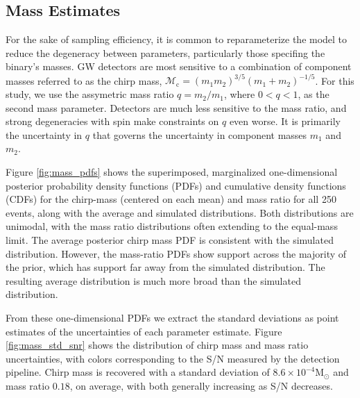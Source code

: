 \subsection{Mass Estimates}

For the sake of sampling efficiency, it is common to reparameterize the model to reduce the degeneracy between parameters, particularly those specifing the binary's masses.  GW detectors are most sensitive to a combination of component masses referred to as the chirp mass, $\mathcal{M}_\mathrm{c} = (m_1 m_2)^{3/5} (m_1 + m_2)^{-1/5}$.  For this study, we use the assymetric mass ratio $q = m_2/m_1$, where $0 < q < 1$, as the second mass parameter.  Detectors are much less sensitive to the mass ratio, and strong degeneracies with spin make constraints on $q$ even worse.  It is primarily the uncertainty in $q$ that governs the uncertainty in component masses $m_1$ and $m_2$.

Figure \ref{fig:mass_pdfs} shows the superimposed, marginalized one-dimensional posterior probability density functions (PDFs) and cumulative density functions (CDFs) for the chirp-mass (centered on each mean) and mass ratio for all 250 events, along with the average and simulated distributions.  Both distributions are unimodal, with the mass ratio distributions often extending to the equal-mass limit.  The average posterior chirp mass PDF is consistent with the simulated distribution.  However, the mass-ratio PDFs show support across the majority of the prior, which has support far away from the simulated distribution.  The resulting average distribution is much more broad than the simulated distribution.

From these one-dimensional PDFs we extract the standard deviations as point estimates of the uncertainties of each parameter estimate.  Figure \ref{fig:mass_std_snr} shows the distribution of chirp mass and mass ratio uncertainties, with colors corresponding to the S/N measured by the detection pipeline.  Chirp mass is recovered with a standard deviation of $8.6 \times 10^{-4} \mathrm{M}_\odot$ and mass ratio $0.18$, on average, with both generally increasing as S/N decreases.
